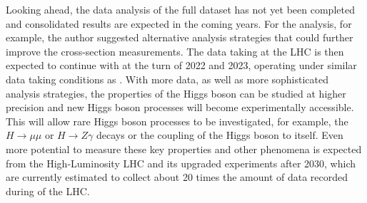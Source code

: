 Looking ahead, the data analysis of the full \RunTwo dataset has not yet been completed and consolidated results are expected in the coming years. For the \HWW analysis, for example, the author suggested alternative analysis strategies that could further improve the \HWW cross-section measurements. 
The data taking at the LHC is then expected to continue with \RunThr at the turn of 2022 and 2023, operating under similar data taking conditions as \RunTwo. 
With more data, as well as more sophisticated analysis strategies, the properties of the Higgs boson can be studied at higher precision and new Higgs boson processes will become experimentally accessible. 
This will allow rare Higgs boson processes to be investigated, for example, the $H \to \mu\mu$ or $H \to Z\gamma$ decays or the coupling of the Higgs boson to itself.
Even more potential to measure these key properties and other phenomena is expected from the High-Luminosity LHC and its upgraded experiments after 2030, which are currently estimated to collect about 20 times the amount of data recorded during \RunTwo of the LHC. 

